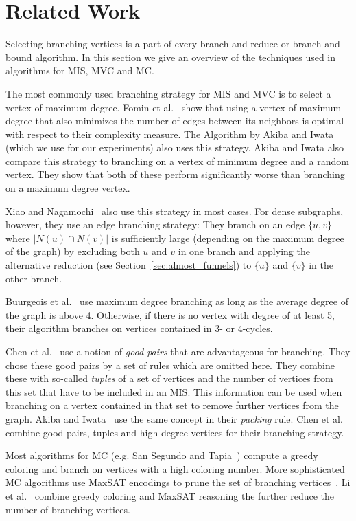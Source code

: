 \documentclass[a4paper,UKenglish,cleveref, autoref, thm-restate]{lipics-v2021}
\begin{document}
\section{Related Work}
Selecting branching vertices is a part of every branch-and-reduce or
branch-and-bound algorithm. In this section we give an overview of the techniques used in
algorithms for MIS, MVC and MC.

The most commonly used branching strategy for MIS and MVC is to select a vertex
of maximum degree. Fomin et al.~\cite{Fomin} show that using a vertex of maximum
degree that also minimizes the number of edges between its neighbors is optimal
with respect to their complexity measure. The Algorithm by Akiba and Iwata~\cite{AkibaIwata}
(which we use for our experiments) also uses this strategy. Akiba and Iwata also
compare this strategy to branching on a vertex of minimum degree and a random
vertex. They show that both of these perform significantly worse than branching
on a maximum degree vertex.

Xiao and Nagamochi~\cite{XiaoNagamochi} also use
this strategy in most cases. For dense subgraphs, however, they use an edge
branching strategy: They branch on an edge $\{u, v\}$ where $|N(u) \cap N(v)|$
is sufficiently large (depending on the maximum degree of the graph) by
excluding both $u$ and $v$ in one branch and applying the alternative reduction
(see Section~\ref{sec:almost_funnels}) to $\{u\}$ and $\{v\}$ in the other branch.

Buurgeois et al.~\cite{Bourgeois} use maximum degree branching as long as the
average degree of the graph is above 4. Otherwise, if there is no vertex with degree of at least 5, their algorithm branches on vertices
contained in 3- or 4-cycles. 

Chen et al.~\cite{ChenXiaKanj} use a notion of \emph{good pairs} that are advantageous
for branching. They chose these good pairs by a set of rules which are omitted
here. They combine these with so-called \emph{tuples} of a set of vertices and the
number of vertices from this set that have to be included in an MIS. This
information can be used when branching on a vertex
contained in that set to remove further vertices from the graph. Akiba and
Iwata~\cite{AkibaIwata} use the same concept in their \emph{packing} rule. Chen
et al. combine good pairs, tuples and high degree vertices for their branching strategy.

Most algorithms for MC (e.g. San Segundo and Tapia~\cite{Color}) compute a
greedy coloring and branch on vertices with a high coloring number.
More sophisticated MC algorithms use MaxSAT encodings to prune the set of
branching vertices~\cite{LiFangXu,LiJiang,LiQuan}. Li et al.~\cite{LiMaxSat}
combine greedy coloring and MaxSAT reasoning the further reduce the number of
branching vertices.
\end{document}
